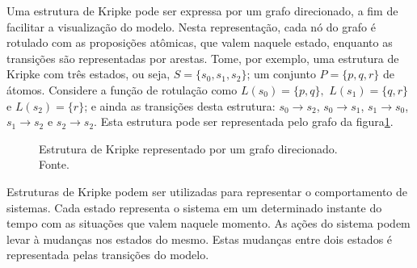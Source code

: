 \documentclass[normaltoc,capchap,capsec,times]{abnt}
\begin{document}
Uma estrutura de Kripke pode ser expressa por um grafo direcionado, a fim de facilitar a visualização do modelo. Nesta representação, cada nó do grafo é rotulado com as proposições atômicas, que valem naquele estado, enquanto as transições são representadas por arestas. Tome, por exemplo, uma estrutura de Kripke com três estados, ou seja, $S = \{s_0,s_1,s_2\}$; um conjunto $P=\{p,q,r\}$ de átomos. Considere a função de rotulação como $L(s_0)=\{p,q\},$  $L(s_1)=\{q,r\}$ e $L(s_2)=\{r\}$; e ainda as transições desta estrutura: $s_0 \to s_2$, $s_0 \to s_1$, $s_1 \to s_0$, $s_1 \to s_2$ e $s_2 \to s_2$. Esta estrutura pode ser representada pelo grafo da figura\ref{fig:ex_kripke1}.

\begin{figure}[htb]
\begin{center}
\end{center}
\caption[Estrutura de Kripke representado por um grafo direcionado]{Estrutura de Kripke representado por um grafo direcionado. \\ Fonte. }
\label{fig:ex_kripke1}
\end{figure}


Estruturas de Kripke podem ser utilizadas para representar o comportamento de sistemas. Cada estado representa o sistema em um determinado instante do tempo com as situações que valem naquele momento. As ações do sistema podem levar à mudanças nos estados do mesmo. Estas mudanças entre dois estados é representada pelas transições do modelo. 
\end{document}
